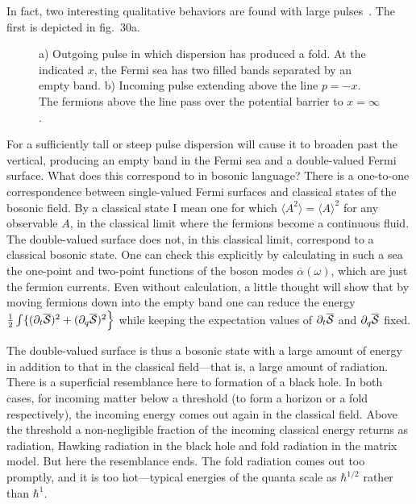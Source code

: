 In fact, two interesting qualitative behaviors
are found with large pulses~\cite{Pclass}.  The first is depicted in
fig.~30a. \begin{figure}
\begin{center}
\leavevmode
{}
\end{center}
\caption[]{a) Outgoing pulse in which dispersion has produced a
fold.  At the indicated $x$, the Fermi sea has two filled bands
separated by an empty band.  b) Incoming pulse extending above
the line $p = -x$.  The fermions above the line pass over the
potential barrier to $x = \infty$.}
\end{figure}
For a sufficiently tall or steep pulse dispersion will cause it
to broaden past the vertical, producing an empty band in the
Fermi sea and a double-valued Fermi surface.  What does this
correspond to in bosonic language?  There is a one-to-one
correspondence between single-valued Fermi surfaces and
classical states of the bosonic field.  By a classical state
I mean one for which $\langle A^2 \rangle = \langle A \rangle^2$
for any observable $A$, in the classical limit where the fermions
become a continuous fluid.  The double-valued surface does not,
in this classical limit, correspond to a classical bosonic
state. One can check this explicitly by calculating in such a sea
the one-point and two-point functions of the boson modes
$\overline\alpha(\omega)$, which are just the fermion currents. 
Even without calculation, a little thought will show that by moving
fermions down into the empty band one can reduce the energy
$\frac{1}{2} \int \{ (\partial_t \overline{\cal S})^2 +
(\partial_q \overline{\cal S})^2 \Bigr\}$ while keeping the
expectation values of $\partial_t \overline{\cal S}$ and
$\partial_q 
\overline{\cal S}$ fixed.

The double-valued surface is thus a bosonic state
with a large amount of energy in addition to that in the classical
field---that is, a large amount of radiation.  There is a
superficial resemblance here to formation of a black hole.  In
both cases, for incoming matter below a threshold (to form a
horizon or a fold respectively), the incoming energy comes out
again in the classical field.  Above the threshold a
non-negligible fraction of the incoming classical energy returns
as radiation, Hawking radiation in the black hole and fold
radiation in the matrix model.  But here the resemblance ends. 
The fold radiation comes out too promptly, and it is too
hot---typical energies of the quanta scale as $\hbar^{1/2}$
rather than $\hbar^1$.

